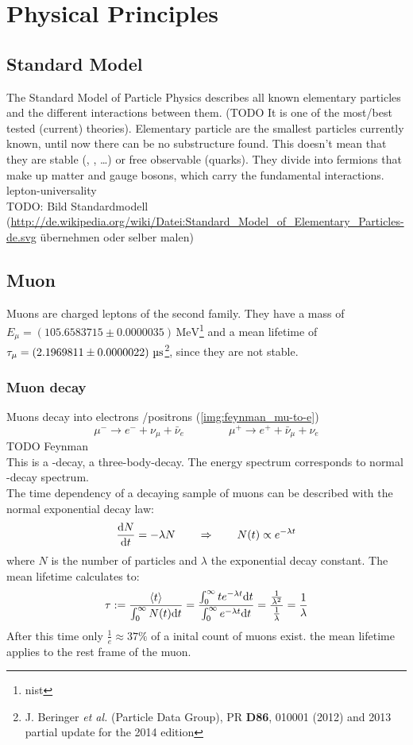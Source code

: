 \section{Physical Principles}
\subsection{Standard Model}
The Standard Model of Particle Physics describes all known elementary particles and the different interactions between them. 
(TODO It is one of the most/best tested (current) theories). Elementary particle are the smallest particles currently known, until now 
there can be no substructure found. This doesn't mean that they are stable (\textmu, \texttau, \ldots) or free observable (quarks). They divide into fermions that make up matter and 
gauge bosons, which carry the fundamental interactions.\\
lepton-universality\\
TODO: Bild Standardmodell (\url{http://de.wikipedia.org/wiki/Datei:Standard_Model_of_Elementary_Particles-de.svg} übernehmen oder selber malen)
\subsection{Muon}
Muons are charged leptons of the second family. They have a mass of 
$E_\mu = (105.6583715 \pm 0.0000035)\,\text{MeV}$\footnote{nist} 
and a mean lifetime of 
$\tau_\mu = \left( 2.1969811 \pm 0.0000022 \right)\,\text{\textmu s}$\footnote{J. Beringer \emph{et al.} (Particle Data Group), PR \textbf{D86}, 010001 (2012) and 2013 partial update for the 2014 edition}, 
since they are not stable.
\subsubsection{Muon decay}
\label{sub:decay}
Muons decay into electrons /positrons (\autoref{img:feynman_mu-to-e})
\begin{equation}
	\mu^- \rightarrow e^- + \nu_\mu + \bar{\nu}_e \qquad \qquad \mu^+ \rightarrow e^+ + \bar{\nu}_\mu + \nu_e
\end{equation}
TODO Feynman \\%
This is a \textbeta-decay, a three-body-decay. The energy spectrum corresponds to normal \textbeta-decay spectrum. \\
The time dependency of a decaying sample of muons can be described with the normal exponential decay law:
\begin{equation}
	\label{eq:expdecay}
	\frac{\mathrm{d} N}{\mathrm{d} t} = - \lambda N \qquad \Rightarrow \qquad N(t) \propto e^{-\lambda t}
\end{equation}
where $N$ is the number of particles and $\lambda$ the exponential decay constant. The mean lifetime calculates to:
\begin{equation}
    \tau := \frac{\left<t\right>}{\int_0^\infty N(t) \mathrm{d} t} = 
    \frac{\int_0^\infty t e^{-\lambda t} \mathrm{d} t}{\int_0^\infty e^{-\lambda t} \mathrm{d} t} = 
    \frac{\frac{1}{\lambda^2}}{\frac{1}{\lambda}} = \frac{1}{\lambda}
\end{equation}
After this time only $\frac{1}{e} \approx 37\%$ of a inital count of muons exist. the mean lifetime applies to the rest frame of the muon.
